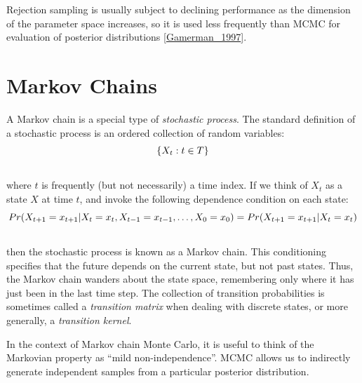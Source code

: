 \documentclass[letterpaper,10pt,english]{sphinxmanual}
\begin{document}
Rejection sampling is usually subject to declining performance as the dimension of the parameter space increases, so it is used less frequently than MCMC for evaluation of posterior distributions {\hyperref[references:gamerman-1997]{{[}Gamerman\_1997{]}}}.


\section{Markov Chains}
\label{theory:markov-chains}
A Markov chain is a special type of \emph{stochastic process}. The standard definition of a stochastic process is an ordered collection of random variables:
\begin{gather}
\begin{split}\{X_t:t \in T\}\end{split}\notag\\\begin{split}\end{split}\notag
\end{gather}
where $t$ is frequently (but not necessarily) a time index. If we think of $X_t$ as a state $X$ at time $t$, and invoke the following dependence condition on each state:
\begin{gather}
\begin{split}Pr(X_{t+1}=x_{t+1} | X_t=x_t, X_{t-1}=x_{t-1},\ldots,X_0=x_0) = Pr(X_{t+1}=x_{t+1} | X_t=x_t)\end{split}\notag\\\begin{split}\end{split}\notag
\end{gather}
then the stochastic process is known as a Markov chain. This conditioning specifies that the future depends on the current state, but not past states. Thus, the Markov chain wanders about the state space, remembering only where it has just been in the last time step. The collection of transition probabilities is sometimes called a \emph{transition matrix} when dealing with discrete states, or more generally, a \emph{transition kernel}.

In the context of Markov chain Monte Carlo, it is useful to think of the Markovian property as ``mild non-independence''. MCMC allows us to indirectly generate independent samples from a particular posterior distribution.
\end{document}
